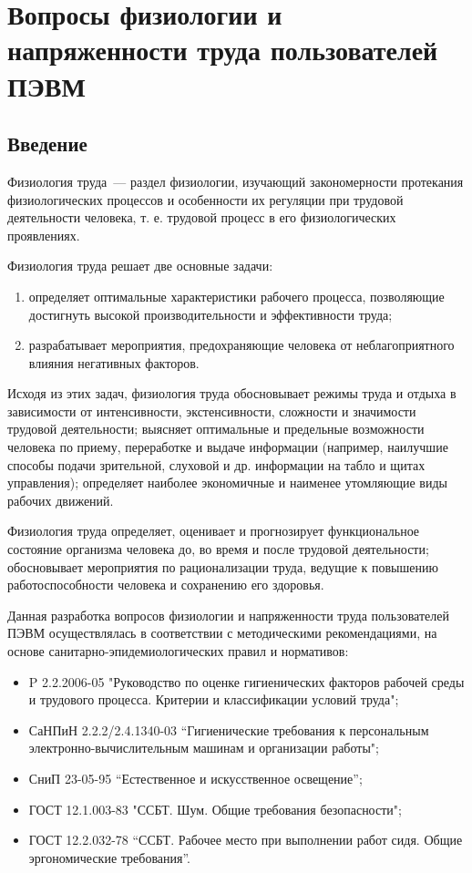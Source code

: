\updateStamp
{}
\section{Вопросы физиологии и напряженности труда пользователей ПЭВМ}
\subsection*{Введение}
Физиология труда~--- раздел физиологии, изучающий закономерности протекания физиологических процессов и особенности их регуляции при трудовой деятельности человека, т. е. трудовой процесс в его физиологических проявлениях. 

Физиология труда решает две основные задачи:
\begin{enumerate}
\item определяет оптимальные характеристики рабочего процесса, позволяющие достигнуть высокой производительности и эффективности труда;
\item разрабатывает мероприятия, предохраняющие человека от неблагоприятного влияния негативных факторов.
\end{enumerate}

Исходя из этих задач, физиология труда обосновывает режимы труда и отдыха в зависимости от интенсивности, экстенсивности, сложности и значимости трудовой деятельности; выясняет оптимальные и предельные возможности человека по приему, переработке и выдаче информации (например, наилучшие способы подачи зрительной, слуховой и др. информации на табло и щитах управления); определяет наиболее экономичные и наименее утомляющие виды рабочих движений.

Физиология труда определяет, оценивает и прогнозирует функциональное состояние организма человека до, во время и после трудовой деятельности; обосновывает мероприятия по рационализации труда, ведущие к повышению работоспособности человека и сохранению его здоровья.

Данная разработка вопросов физиологии и напряженности труда пользователей ПЭВМ осуществлялась в соответствии с методическими рекомендациями, на основе санитарно-эпидемиологических правил и нормативов:
\begin{itemize}
\item P 2.2.2006-05 "Руководство по оценке гигиенических факторов рабочей среды и трудового процесса. Критерии и классификации условий труда";
\item СаНПиН 2.2.2/2.4.1340-03 “Гигиенические требования к персональным электронно-вычислительным машинам и организации работы";
\item СниП 23-05-95 “Естественное и искусственное освещение”;
\item ГОСТ 12.1.003-83 "ССБТ. Шум. Общие требования безопасности";
\item ГОСТ 12.2.032-78 “ССБТ. Рабочее место при выполнении работ сидя. Общие эргономические требования”.
\end{itemize}

